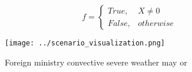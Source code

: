 \documentclass[a4paper]{article}
\begin{document}
\begin{equation}   f =
\begin{cases} True, & X \neq 0\\
False, & otherwise
\end{cases}
\end{equation}

\begin{figure}
\centering
\texttt{[image: ../scenario\_visualization.png]}
\caption{Foreign ministry convective severe weather may or
}
\end{figure}
 
\end{document}

